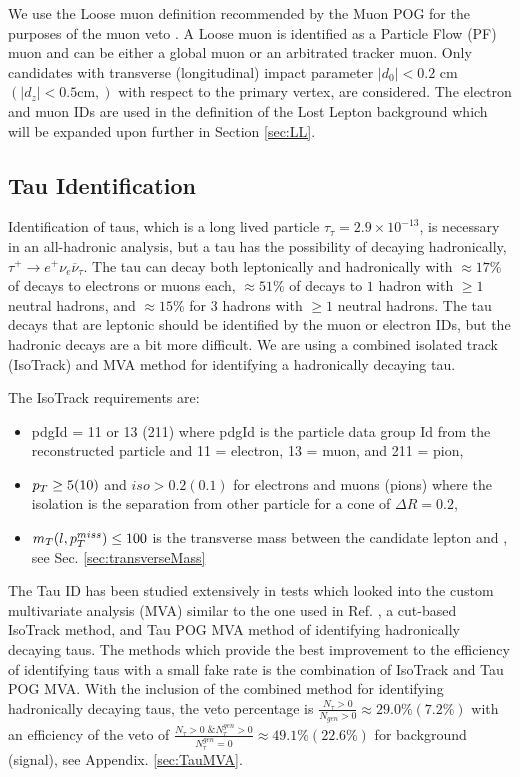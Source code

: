  We use the Loose muon definition recommended by the Muon POG for the purposes of the muon veto \cite{noauthor_https://twiki.cern.ch/twiki/bin/view/cmspublic/swguidemuonidloose_muon_nodate}. A Loose muon is identified as a Particle Flow (PF)\cite{noauthor_cms_nodate} muon and can be either a global muon or an arbitrated tracker muon. Only candidates with transverse (longitudinal) impact parameter $|d_0|<0.2$ cm $(|d_z|<0.5 \text{cm},)$ with respect to the primary vertex, are considered. The electron and muon IDs are used in the definition of the Lost Lepton background which will be expanded upon further in Section \ref{sec:LL}. 
 
\subsection{Tau Identification}\label{TauID}
Identification of taus, which is a long lived particle $\tau_\tau=2.9\times10^{-13}$, is necessary in an all-hadronic analysis, but a tau has the possibility of decaying hadronically, $\tau^+\rightarrow e^+ \nu_e\overline{\nu}_\tau$. The tau can decay both leptonically and hadronically with $\approx17\%$ of decays to electrons or muons each, $\approx51\%$ of decays to $1$ hadron with $\geq1$ neutral hadrons, and $\approx15\%$ for 3 hadrons with $\geq1$ neutral hadrons. The tau decays that are leptonic should be identified by the muon or electron IDs, but the hadronic decays are a bit more difficult. We are using a combined isolated track (IsoTrack) and MVA method for identifying a hadronically decaying tau. 

The IsoTrack requirements are:
\begin{itemize}
	\item pdgId = 11 or 13 (211) where pdgId is the particle data group Id from the reconstructed particle and 11 = electron, 13 = muon, and 211 = pion,
	\item $p_{T}\geq5(10)$ and $iso>0.2(0.1)$ for electrons and muons (pions) where the isolation is the separation from other particle for a cone of $\Delta R=0.2$,
	\item $m_T(l,p_{T}^{miss})\leq100$ is the transverse mass between the candidate lepton and \met, see Sec. \ref{sec:transverseMass}
\end{itemize}

The Tau ID has been studied extensively in tests which looked into the custom multivariate analysis (MVA) \cite{roe_boosted_2004, hoecker_tmva_2007, bravo_search_2015} similar to the one used in Ref. \cite{cms_collaboration_search_2016}, a cut-based IsoTrack method, and Tau POG MVA method of identifying hadronically decaying taus. The methods which provide the best improvement to the efficiency of identifying taus with a small fake rate is the combination of IsoTrack and Tau POG MVA. With the inclusion of the combined method for identifying hadronically decaying taus, the veto percentage is $\frac{N_\tau>0}{N_{gen}>0}\approx29.0\%(7.2\%)$ with an efficiency of the veto of $\frac{N_\tau>0\text{ \& }N_\tau^{gen}>0}{N_\tau^{gen}=0}\approx49.1\%(22.6\%)$ for \ttbar{} background (signal), see Appendix. \ref{sec:TauMVA}. 

